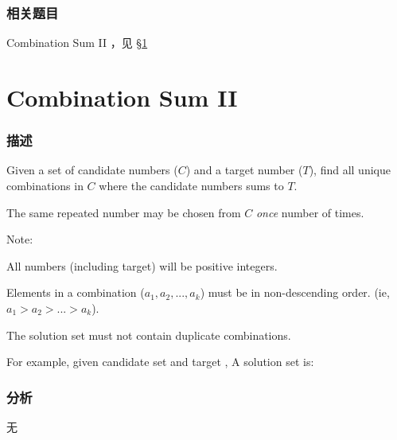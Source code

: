 \subsubsection{相关题目}
\begindot
\item Combination Sum II ，见 \S \ref{sec:combination-sum-ii}
\myenddot


\section{Combination Sum II} %
\label{sec:combination-sum-ii}


\subsubsection{描述}
Given a set of candidate numbers ($C$) and a target number ($T$), find all unique combinations in $C$ where the candidate numbers sums to $T$.

The same repeated number may be chosen from $C$ \emph{once} number of times.

Note:
\begindot
\item All numbers (including target) will be positive integers.
\item Elements in a combination ($a_1, a_2, ..., a_k$) must be in non-descending order. (ie, $a_1 > a_2 > ... > a_k$).
\item The solution set must not contain duplicate combinations.
\myenddot

For example, given candidate set  and target , 
A solution set is: 
\begin{Code}
	[1, 7] 
	[1, 2, 5] 
	[2, 6] 
	[1, 1, 6]
\end{Code}


\subsubsection{分析}
无


